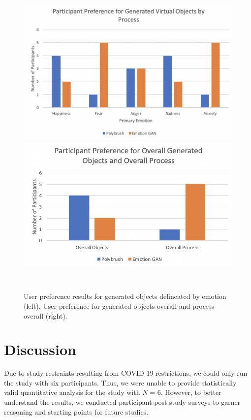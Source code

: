 \documentclass{sigchi}
\begin{document}
\begin{figure}
  \centering
  \includegraphics[width=2\columnwidth]{figures/emotiongraph}
  \includegraphics[width=2\columnwidth]{figures/overallgraph}
  \caption{User preference results for generated objects delineated by emotion (left). User preference for generated objects overall and process overall (right).}~\label{fig:figure5}
\end{figure}

\section{Discussion}
Due to study restraints resulting from COVID-19 restrictions, we could only run the study with six participants. Thus, we were unable to provide statistically valid quantitative analysis for the study with \emph N = 6. However, to better understand the results, we conducted participant post-study surveys to garner reasoning and starting points for future studies. 
\end{document}
